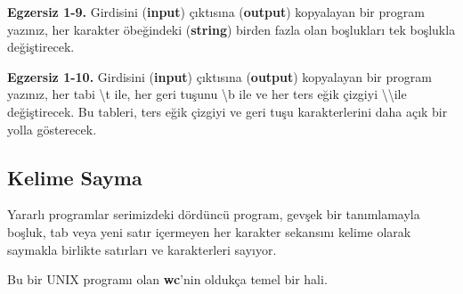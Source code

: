 \documentclass[a4paper,12pt,oneside]{book}
\begin{document}
\noindent \textbf{Egzersiz 1-9.} Girdisini (\textbf{input}) çıktısına (\textbf{output}) kopyalayan bir program yazınız, her karakter öbeğindeki (\textbf{string}) birden fazla olan boşlukları tek boşlukla değiştirecek. \newline

\noindent \textbf{Egzersiz 1-10.} Girdisini (\textbf{input}) çıktısına (\textbf{output}) kopyalayan bir program yazınız, her tabi \textbackslash t ile, her geri tuşunu \textbackslash b ile ve her ters eğik çizgiyi \textbackslash \textbackslash ile değiştirecek. Bu tableri, ters eğik çizgiyi ve geri tuşu karakterlerini daha açık bir yolla gösterecek.

\subsection{Kelime Sayma}

\par Yararlı programlar serimizdeki dördüncü program, gevşek bir tanımlamayla boşluk, tab veya yeni satır içermeyen her karakter sekansını kelime olarak saymakla birlikte satırları ve karakterleri sayıyor. \pagebreak

\noindent Bu bir UNIX programı olan \textbf{wc}'nin oldukça temel bir hali.
\end{document}
